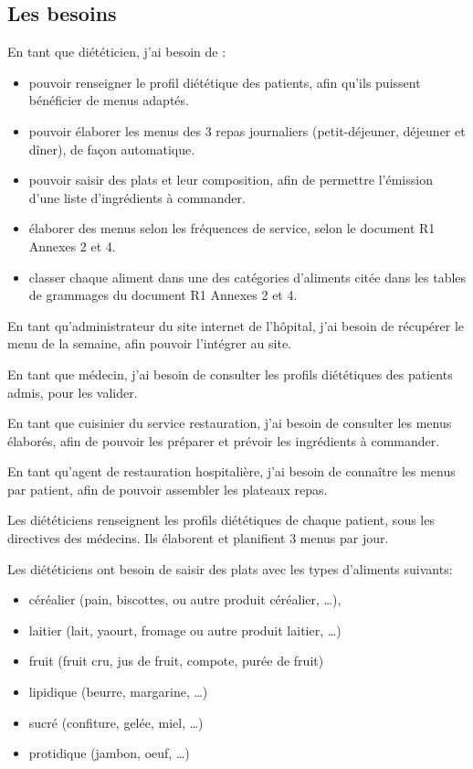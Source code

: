 \subsection{Les besoins}
En tant que diététicien, j’ai besoin de :
\begin{itemize}
 \item pouvoir renseigner le profil diététique des patients, afin qu’ils puissent bénéficier de menus adaptés.
 \item pouvoir élaborer les menus des 3 repas journaliers (petit-déjeuner, déjeuner et dîner), de façon automatique.
 \item pouvoir saisir des plats et leur composition, afin de permettre l’émission d’une liste d’ingrédients à commander.
 \item élaborer des menus selon les fréquences de service, selon le document R1 Annexes 2 et 4.
 \item classer chaque aliment dans une des catégories d’aliments citée dans les tables de grammages du document R1 Annexes 2 et 4.
\end{itemize}
En tant qu’administrateur du site internet de l’hôpital, j’ai besoin de récupérer le menu de la semaine, afin pouvoir l’intégrer au site.

En tant que médecin, j’ai besoin de consulter les profils diététiques des patients admis, pour les  valider.

En tant que cuisinier du service restauration, j’ai besoin de consulter les menus élaborés, afin de pouvoir les préparer et prévoir les ingrédients à commander.

En tant qu’agent de restauration hospitalière,  j’ai besoin de connaître les menus par patient, afin de pouvoir assembler les plateaux repas.

Les diététiciens renseignent les profils diététiques de chaque patient, sous les directives des médecins. Ils élaborent et planifient 3 menus par jour.

Les diététiciens ont besoin de saisir des plats avec les types d'aliments suivants:
\begin{itemize}
 \item céréalier (pain, biscottes, ou autre produit céréalier, …),
 \item laitier (lait, yaourt, fromage ou autre produit laitier, …)
 \item fruit (fruit cru, jus de fruit, compote, purée de fruit)
 \item lipidique (beurre, margarine, …)
 \item sucré (confiture, gelée, miel, …)
 \item protidique (jambon, oeuf, …)
\end{itemize}

